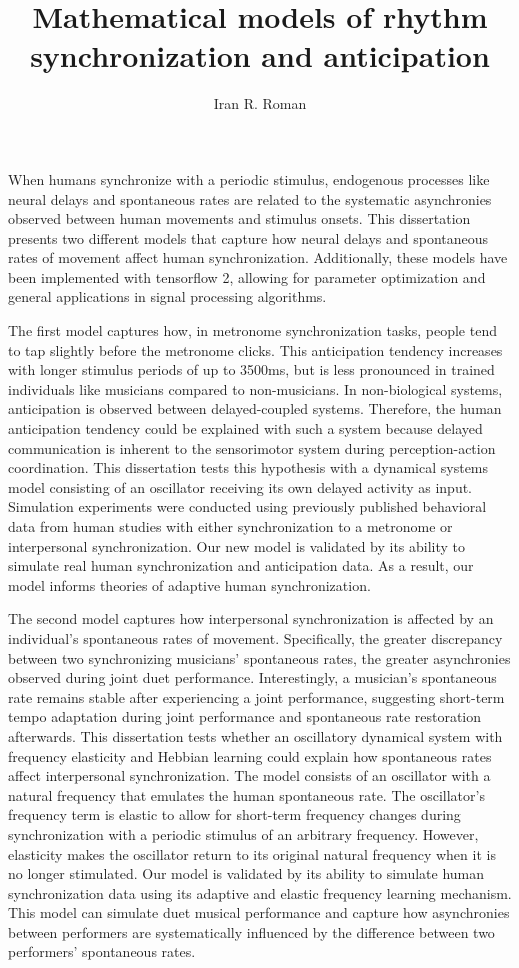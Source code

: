 \documentclass{report}
\begin{document}
\title{Mathematical models of rhythm synchronization and anticipation}
\author{Iran R. Roman}

\beforepreface

When humans synchronize with a periodic stimulus, endogenous processes like neural delays and spontaneous rates are related to the systematic asynchronies observed between human movements and stimulus onsets. This dissertation presents two different models that capture how neural delays and spontaneous rates of movement affect human synchronization. Additionally, these models have been implemented with tensorflow 2, allowing for parameter optimization and general applications in signal processing algorithms.

The first model captures how, in metronome synchronization tasks, people tend to tap slightly before the metronome clicks. This anticipation tendency increases with longer stimulus periods of up to 3500ms, but is less pronounced in trained individuals like musicians compared to non-musicians. In non-biological systems, anticipation is observed between delayed-coupled systems. Therefore, the human anticipation tendency could be explained with such a system because delayed communication is inherent to the sensorimotor system during perception-action coordination. This dissertation tests this hypothesis with a dynamical systems model consisting of an oscillator receiving its own delayed activity as input. Simulation experiments were conducted using previously published behavioral data from human studies with either synchronization to a metronome or interpersonal synchronization. Our new model is validated by its ability to simulate real human synchronization and anticipation data. As a result, our model informs theories of adaptive human synchronization.

The second model captures how interpersonal synchronization is affected by an individual's spontaneous rates of movement. Specifically, the greater discrepancy between two synchronizing musicians' spontaneous rates, the greater asynchronies observed during joint duet performance. Interestingly, a musician's spontaneous rate remains stable after experiencing a joint performance, suggesting short-term tempo adaptation during joint performance and spontaneous rate restoration afterwards. This dissertation tests whether an oscillatory dynamical system with frequency elasticity and Hebbian learning could explain how spontaneous rates affect interpersonal synchronization. The model consists of an oscillator with a natural frequency that emulates the human spontaneous rate. The oscillator's frequency term is elastic to allow for short-term frequency changes during synchronization with a periodic stimulus of an arbitrary frequency. However, elasticity makes the oscillator return to its original natural frequency when it is no longer stimulated. Our model is validated by its ability to simulate human synchronization data using its adaptive and elastic frequency learning mechanism. This model can simulate duet musical performance and capture how asynchronies between performers are systematically influenced by the difference between two performers' spontaneous rates.
\end{document}
